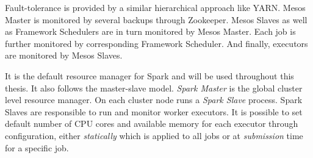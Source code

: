 \begin{description}[leftmargin=0pt]
    Fault-tolerance is provided by a similar hierarchical approach like YARN. Mesos Master is monitored by several backups through Zookeeper. Mesos Slaves as well as Framework Schedulers are in turn monitored by Mesos Master. Each job is further monitored by corresponding Framework Scheduler. And finally, executors are monitored by Mesos Slaves. 
    \item [Spark Standalone] It is the default resource manager for Spark and will be used throughout this thesis. It also follows the master-slave model. \emph{Spark Master} is the global cluster level resource manager. On each cluster node runs a \emph{Spark Slave} process. Spark Slaves are responsible to run and monitor worker executors. It is possible to set default number of CPU cores and available memory for each executor through configuration, either \emph{statically} which is applied to all jobs or at \emph{submission} time for a specific job.
    

\end{description}
